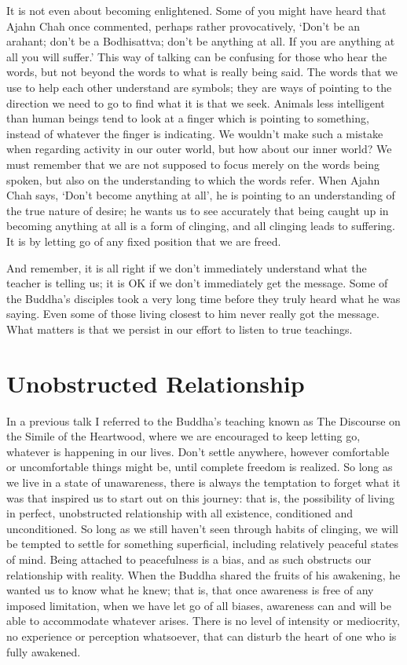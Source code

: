 It is not even about becoming enlightened. Some of you might have heard
that Ajahn Chah once commented, perhaps rather provocatively, ‘Don’t be
an arahant; don’t be a Bodhisattva; don’t be anything at all. If you are
anything at all you will suffer.’ This way of talking can be confusing
for those who hear the words, but not beyond the words to what is really
being said. The words that we use to help each other understand are
symbols; they are ways of pointing to the direction we need to go to
find what it is that we seek. Animals less intelligent than human beings
tend to look at a finger which is pointing to something, instead of
whatever the finger is indicating. We wouldn’t make such a mistake when
regarding activity in our outer world, but how about our inner world? We
must remember that we are not supposed to focus merely on the words
being spoken, but also on the understanding to which the words refer.
When Ajahn Chah says, ‘Don’t become anything at all’, he is pointing to
an understanding of the true nature of desire; he wants us to see
accurately that being caught up in becoming anything at all is a form of
clinging, and all clinging leads to suffering. It is by letting go of
any fixed position that we are freed.

And remember, it is all right if we don’t immediately understand what
the teacher is telling us; it is OK if we don’t immediately get the
message. Some of the Buddha’s disciples took a very long time before
they truly heard what he was saying. Even some of those living closest
to him never really got the message. What matters is that we persist in
our effort to listen to true teachings.

\section{Unobstructed Relationship}

In a previous talk I referred to the Buddha’s teaching known as The
Discourse on the Simile of the
Heartwood\cite{mahasaropama-sutta}, where we are encouraged to
keep letting go, whatever is happening in our lives. Don’t settle
anywhere, however comfortable or uncomfortable things might be, until
complete freedom is realized. So long as we live in a state of
unawareness, there is always the temptation to forget what it was that
inspired us to start out on this journey: that is, the possibility of
living in perfect, unobstructed relationship with all existence,
conditioned and unconditioned. So long as we still haven’t seen through
habits of clinging, we will be tempted to settle for something
superficial, including relatively peaceful states of mind. Being
attached to peacefulness is a bias, and as such obstructs our
relationship with reality. When the Buddha shared the fruits of his
awakening, he wanted us to know what he knew; that is, that once
awareness is free of any imposed limitation, when we have let go of all
biases, awareness can and will be able to accommodate whatever arises.
There is no level of intensity or mediocrity, no experience or
perception whatsoever, that can disturb the heart of one who is fully
awakened.

